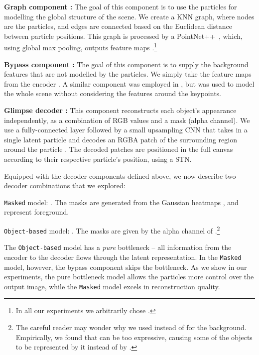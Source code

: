 \documentclass[nohyperref]{article}
\theoremstyle{plain}
\theoremstyle{definition}
\theoremstyle{remark}
\newenvironment{packed_enumerate}{
\begin{enumerate}
  \setlength{\itemsep}{1pt}
  \setlength{\parskip}{0pt}
  \setlength{\parsep}{0pt}
}{\end{enumerate}}
\begin{document}
\textbf{Graph component :} The goal of this component is to use the particles for modelling the global structure of the scene. We create a KNN graph, where nodes are the particles, and edges are connected based on the Euclidean distance between particle positions. This graph is processed by a PointNet++~\citep{qi2017pointnet++}, which, using global max pooling, outputs feature maps .\footnote{In all our experiments we arbitrarily chose .}


\textbf{Bypass component :} The goal of this component is to supply the background features that are not modelled by the particles.
We simply take the feature maps from the encoder .
A similar component was employed in \citet{jakab2018unsupervised}, but was used to model the whole scene without considering the features around the keypoints.

\textbf{Glimpse decoder :} This component reconstructs each object's appearance independently, as a combination of RGB values and a mask (alpha channel).  We use a fully-connected layer followed by a small upsampling CNN that takes in a single latent particle  and decodes an RGBA patch of the surrounding region around the particle . The decoded patches are positioned in the full  canvas according to their respective particle's position, using a STN.



Equipped with the decoder components defined above, we now describe two  decoder combinations that we explored:
\begin{packed_enumerate}
\vspace{-1em}
\item \texttt{Masked} model: . 
    The masks  are generated from the Gaussian heatmaps , and represent foreground. 
\item \texttt{Object-based} model: . The masks  are given by the alpha channel of .\footnote{The careful reader may wonder why we used  instead of  for the background. Empirically, we found that  can be too expressive, causing some of the objects to be represented by it instead of by .}
\end{packed_enumerate}
\vspace{-1em}
The \texttt{Object-based} model has a \textit{pure} bottleneck -- all information from the encoder to the decoder flows through the latent representation. In the \texttt{Masked} model, however, the bypass component  skips the bottleneck. As we show in our experiments, the pure bottleneck model allows the particles more control over the output image, while the \texttt{Masked} model excels in reconstruction quality. 
\end{document}
